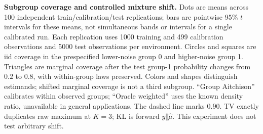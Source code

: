 \textbf{Subgroup coverage and controlled mixture shift.} Dots are means across 100 independent train/calibration/test replications; bars are pointwise 95\% $t$ intervals for these means, not simultaneous bands or intervals for a single calibrated run. Each replication uses 1000 training and 499 calibration observations and 5000 test observations per environment. Circles and squares are iid coverage in the prespecified lower-noise group 0 and higher-noise group 1. Triangles are marginal coverage after the test group-1 probability changes from $0.2$ to $0.8$, with within-group laws preserved. Colors and shapes distinguish estimands; shifted marginal coverage is not a third subgroup. ``Group Aitchison'' calibrates within observed groups; ``Oracle weighted'' uses the known density ratio, unavailable in general applications. The dashed line marks 0.90. TV exactly duplicates raw maximum at $K=3$; KL is forward $y\Vert\hat\mu$. This experiment does not test arbitrary shift.
